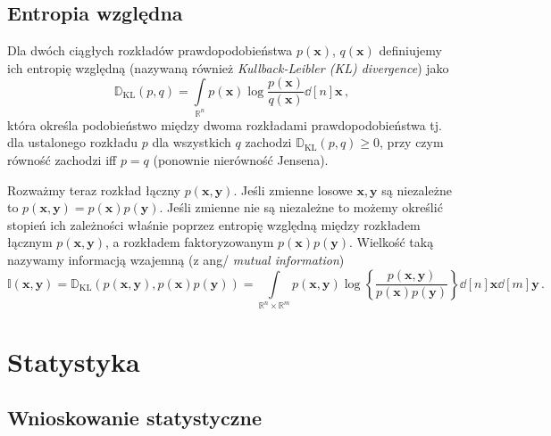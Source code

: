 \documentclass{myclass}
\begin{document}
\subsection{Entropia względna}
Dla dwóch ciągłych rozkładów prawdopodobieństwa \(p(\mathbf{x})\), \(q(\mathbf{x})\) definiujemy ich
entropię względną (nazywaną również \textit{Kullback-Leibler (KL) divergence}) jako
\begin{equation*}
    \mathbb{D}_\text{KL}(p , q) = \int\limits_{\mathbb{R}^n} p(\mathbf{x})\log\frac{p(\mathbf{x})}{q(\mathbf{x})} \dd[n]{\mathbf{x}}\,,
\end{equation*}
która określa podobieństwo między dwoma rozkładami prawdopodobieństwa tj. dla ustalonego rozkładu
\(p\) dla wszystkich \(q\) zachodzi \(\mathbb{D}_\text{KL}(p,q) \geq 0\), przy czym równość zachodzi
iff \(p = q\) (ponownie nierówność Jensena).

Rozważmy teraz rozkład łączny \(p(\mathbf{x}, \mathbf{y})\). Jeśli zmienne losowe \(\mathbf{x},
\mathbf{y}\) są niezależne to \(p(\mathbf{x}, \mathbf{y}) = p(\mathbf{x}) p(\mathbf{y})\). Jeśli
zmienne nie są niezależne to możemy określić stopień ich zależności właśnie poprzez entropię
względną między rozkładem łącznym \(p(\mathbf{x}, \mathbf{y})\), a rozkładem faktoryzowanym
\(p(\mathbf{x})p(\mathbf{y})\). Wielkość taką nazywamy informacją wzajemną (z ang/ \textit{mutual
information})
\begin{equation*}
    \mathbb{I}(\mathbf{x} , \mathbf{y}) = \mathbb{D}_\text{KL}(p(\mathbf{x}, \mathbf{y}), p(\mathbf{x})p(\mathbf{y})) = \int\limits_{\mathbb{R}^n\times\mathbb{R}^m} p(\mathbf{x}, \mathbf{y})\log\left\{\frac{p(\mathbf{x}, \mathbf{y})}{p(\mathbf{x})p(\mathbf{y})}\right\} \dd[n]{\mathbf{x}} \dd[m]{\mathbf{y}}\,.
\end{equation*}

\section{Statystyka}

\subsection{Wnioskowanie statystyczne}
\end{document}
